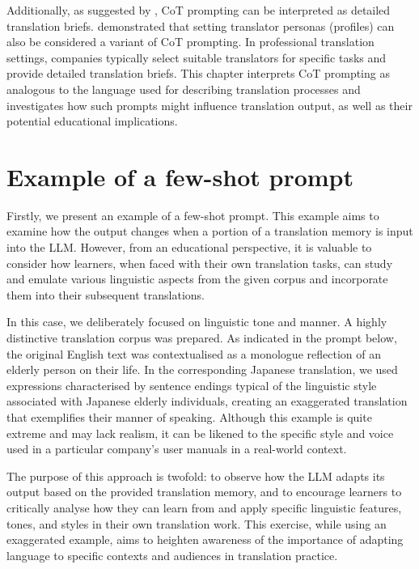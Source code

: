 \documentclass[output=paper,colorlinks,citecolor=brown, japanesefont]{langscibook}
\begin{document}
Additionally, as suggested by \textcite{yamada-2023-optimizing}, CoT prompting can be interpreted as detailed translation briefs. \textcite{he2024promptingchatgpttranslationcomparative} demonstrated that setting translator personas (profiles) can also be considered a variant of CoT prompting. In professional translation settings, companies typically select suitable translators for specific tasks and provide detailed translation briefs. This chapter interprets CoT prompting as analogous to the language used for describing translation processes \citep{Miyata2023} and investigates how such prompts might influence translation output, as well as their potential educational implications.

\section{Example of a few-shot prompt}
Firstly, we present an example of a few-shot prompt. This example aims to examine how the output changes when a portion of a translation memory is input into the LLM. However, from an educational perspective, it is valuable to consider how learners, when faced with their own translation tasks, can study and emulate various linguistic aspects from the given corpus and incorporate them into their subsequent translations.

In this case, we deliberately focused on linguistic tone and manner. A highly distinctive translation corpus was prepared. As indicated in the prompt below, the original English text was contextualised as a monologue reflection of an elderly person on their life. In the corresponding Japanese translation, we used expressions characterised by sentence endings typical of the linguistic style associated with Japanese elderly individuals, creating an exaggerated translation that exemplifies their manner of speaking. Although this example is quite extreme and may lack realism, it can be likened to the specific style and voice used in a particular company's user manuals in a real-world context.

The purpose of this approach is twofold: to observe how the LLM adapts its output based on the provided translation memory, and to encourage learners to critically analyse how they can learn from and apply specific linguistic features, tones, and styles in their own translation work. This exercise, while using an exaggerated example, aims to heighten awareness of the importance of adapting language to specific contexts and audiences in translation practice.
\end{document}
